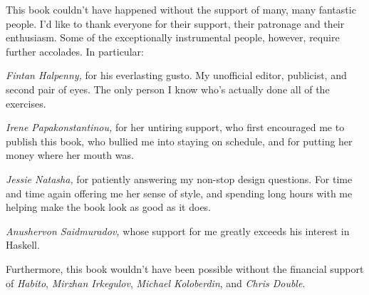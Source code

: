 \documentclass[book.tex]{subfiles}
\begin{document}

This book couldn't have happened without the support of many, many fantastic
people. I'd like to thank everyone for their support, their patronage and their
enthusiasm. Some of the exceptionally instrumental people, however, require
further accolades. In particular:

\emph{Fintan Halpenny,} for his everlasting gusto. My unofficial editor,
publicist, and second pair of eyes. The only person I know who's actually done
all of the exercises.

\emph{Irene Papakonstantinou,} for her untiring support, who first encouraged me
to publish this book, who bullied me into staying on schedule, and for putting
her money where her mouth was.

\emph{Jessie Natasha,} for patiently answering my non-stop design questions. For
time and time again offering me her sense of style, and spending long hours with
me helping make the book look as good as it does.

\emph{Anushervon Saidmuradov,} whose support for me greatly exceeds his interest
in Haskell.

Furthermore, this book wouldn't have been possible without the financial support
of \emph{Habito}, \emph{Mirzhan Irkegulov}, \emph{Michael Koloberdin},
and \emph{Chris Double}.
\end{document}
